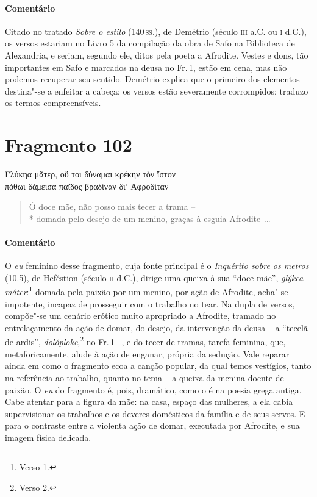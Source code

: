 {\paragraph{Comentário} Citado no tratado \textit{Sobre o estilo} (140\,\textsc{ss}.), de Demétrio (século \textsc{iii} a.C. ou \textsc{i} d.C.), os versos estariam no Livro 5 da compilação da obra de Safo na Biblioteca de Alexandria, e seriam, segundo ele, ditos pela poeta a Afrodite. Vestes e dons, tão importantes em Safo e marcados na deusa no Fr.\,1, estão em cena, mas não podemos recuperar seu sentido. Demétrio explica que o primeiro dos elementos destina"-se a enfeitar a cabeça; os versos estão severamente corrompidos; traduzo os termos compreensíveis.}

\pagebreak

\section{Fragmento 102}

\begin{gkverse}
Γλύκηα μᾶτερ, οὔ τοι δύναμαι κρέκην τὸν ἴστον\\
πόθωι δάμεισα παῖδος βραδίναν δι’ Ἀφροδίταν
\end{gkverse}

\begin{verse}
Ó doce mãe, não posso mais tecer a trama -- \\*
domada pelo desejo de um menino, graças à esguia \mbox{Afrodite \ldots{}}
\end{verse}

\medskip

{\paragraph{Comentário} O \textit{eu} feminino desse fragmento, cuja fonte principal é o \textit{Inquérito
sobre os metros} (10.5), de Heféstion (século \textsc{ii} d.C.), dirige uma queixa à sua
``doce mãe'', \textit{glýkēa mâter}:\footnote{Verso 1.} domada pela paixão por um menino, por ação de Afrodite, acha"-se impotente, incapaz de prosseguir com o trabalho no tear. Na dupla de
versos, compõe"-se um cenário erótico muito apropriado a Afrodite, tramado no
entrelaçamento da ação de domar, do desejo, da intervenção da deusa
-- a ``tecelã de ardis'', \textit{dolóploke},\footnote{Verso 2.} no Fr.\,1 --, e do tecer de tramas, tarefa feminina, que, metaforicamente, alude à ação de enganar, própria da sedução.
Vale reparar ainda em como o fragmento ecoa a canção popular, da qual
temos vestígios, tanto na referência ao trabalho, quanto no tema -- a queixa da
menina doente de paixão. O \textit{eu} do fragmento é, pois, dramático, como o é
na poesia grega antiga. Cabe atentar para a figura da mãe: na
casa, espaço das mulheres, a ela cabia supervisionar os trabalhos e os deveres
domésticos da família e de seus servos. E para o contraste entre a violenta
ação de domar, executada por Afrodite, e sua imagem física delicada.}

